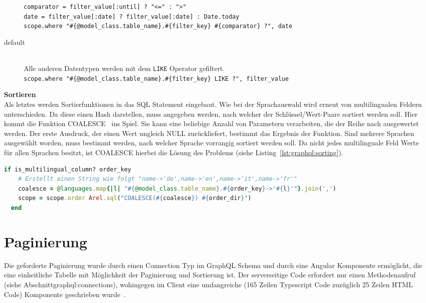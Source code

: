 \begin{description}
		\lstinline|comparator = filter_value[:until] ? "<=" : ">"| \\
		\lstinline|date = filter_value[:date] ? filter_value[:date] : Date.today| \\
		\lstinline|scope.where "#{@model_class.table_name}.#{filter_key} #{comparator} ?", date|
	\item[default] \ \\
		Alle anderen Datentypen werden mit dem \texttt{LIKE} Operator gefiltert. \\
		\lstinline|scope.where "#{@model_class.table_name}.#{filter_key} LIKE ?", filter_value|
\end{description}

\textbf{Sortieren} \ \\
Als letztes werden Sortierfunktionen in das SQL Statement eingebaut. Wie bei der Sprachauswahl wird erneut von multilingualen Feldern unterschieden.
Da diese einen Hash darstellen, muss angegeben werden, nach welcher der Schlüssel/Wert-Paare sortiert werden soll. Hier kommt die Funktion COALESCE~\cite{coalesce-postgres} ins Spiel. Sie kann eine beliebige Anzahl von Parametern verarbeiten, die der Reihe nach ausgewertet werden. Der erste Ausdruck, der einen Wert ungleich NULL zurückliefert, bestimmt das Ergebnis der Funktion. Sind mehrere Sprachen ausgewählt worden, muss bestimmt werden, nach welcher Sprache vorrangig sortiert werden soll. Da nicht jedes multilinguale Feld Werte für allen Sprachen besitzt, ist COALESCE hierbei die Lösung des Problems (siehe Listing~\ref{lst:graphql:sorting}).

\begin{lstlisting}[language=Ruby,float=h!,caption={Sortieren von Feldern in der Klasse BaseResolver}, label={lst:graphql:sorting}] 
  if is_multilingual_column? order_key
    # Erstellt einen String wie folgt "name->'de',name->'en',name->'it',name->'fr'"
    coalesce = @languages.map{|l| "#{@model_class.table_name}.#{order_key}->'#{l}'"}.join(',')
    scope = scope.order Arel.sql("COALESCE(#{coalesce}) #{order_dir}")
  end
\end{lstlisting}

\section{Paginierung}
\label{impl:pagination}
Die geforderte Paginierung wurde durch einen Connection Typ im GraphQL Schema und durch eine Angular Komponente ermöglicht, die eine einheitliche Tabelle mit Möglichkeit der Paginierung und Sortierung ist.
Der serverseitige Code erfordert nur einen Methodenaufruf (siehe Abschnitt{graphql:connections}), wohingegen im Client eine umfangreiche (165 Zeilen Typescript Code zuzüglich 25 Zeilen HTML Code) Komponente geschrieben wurde~\cite{paginator-table}.

